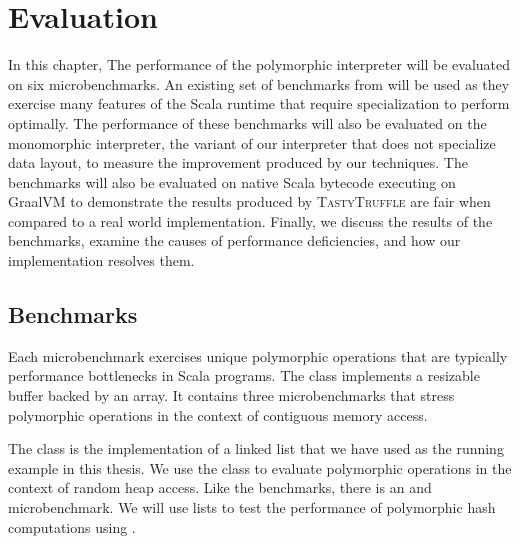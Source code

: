 \chapter{Evaluation}
\label{chapter:evaluation}
In this chapter, The performance of the polymorphic interpreter will be evaluated on six microbenchmarks.
An existing set of benchmarks from \cite{scala:miniboxing} will be used as they exercise many features of the Scala runtime that require specialization to perform optimally.
The performance of these benchmarks will also be evaluated on the monomorphic interpreter, the variant of our interpreter that does not specialize data layout, to measure the improvement produced by our techniques. 
The benchmarks will also be evaluated on native Scala bytecode executing on GraalVM to demonstrate the results produced by \textsc{TastyTruffle} are fair when compared to a real world implementation.
Finally, we discuss the results of the benchmarks, examine the causes of performance deficiencies, and how our implementation resolves them.

\section{Benchmarks}

Each microbenchmark exercises unique polymorphic operations that are typically performance bottlenecks\cite{scala:collections-optimization,scala:dacapo} in Scala programs.
The  class implements a resizable buffer backed by an array.
It contains three microbenchmarks that stress polymorphic operations in the context of contiguous memory access.

The  class is the implementation of a linked list that we have used as the running example in this thesis.
We use the  class to evaluate polymorphic operations in the context of random heap access.
Like the  benchmarks, there is an  and  microbenchmark.
We will use lists to test the performance of polymorphic hash computations using .


